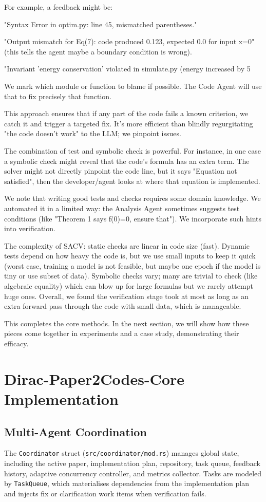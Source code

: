 \documentclass{ieeeaccess}
\begin{document}
For example, a feedback might be:

"Syntax Error in optim.py: line 45, mismatched parentheses."

"Output mismatch for Eq(7): code produced 0.123, expected 0.0 for input x=0" (this tells the agent maybe a boundary condition is wrong).

"Invariant 'energy conservation' violated in simulate.py (energy increased by 5%

We mark which module or function to blame if possible. The Code Agent will use that to fix precisely that function.

This approach ensures that if any part of the code fails a known criterion, we catch it and trigger a targeted fix. It's more efficient than blindly regurgitating "the code doesn't work" to the LLM; we pinpoint issues.

The combination of test and symbolic check is powerful. For instance, in one case a symbolic check might reveal that the code's formula has an extra term. The solver might not directly pinpoint the code line, but it says "Equation not satisfied", then the developer/agent looks at where that equation is implemented.

We note that writing good tests and checks requires some domain knowledge. We automated it in a limited way: the Analysis Agent sometimes suggests test conditions (like "Theorem 1 says f(0)=0, ensure that"). We incorporate such hints into verification.

The complexity of SACV: static checks are linear in code size (fast). Dynamic tests depend on how heavy the code is, but we use small inputs to keep it quick (worst case, training a model is not feasible, but maybe one epoch if the model is tiny or use subset of data). Symbolic checks vary; many are trivial to check (like algebraic equality) which can blow up for large formulas but we rarely attempt huge ones. Overall, we found the verification stage took at most as long as an extra forward pass through the code with small data, which is manageable.

This completes the core methods. In the next section, we will show how these pieces come together in experiments and a case study, demonstrating their efficacy.

\section{Dirac-Paper2Codes-Core Implementation}
\subsection{Multi-Agent Coordination}
The \texttt{Coordinator} struct (\texttt{src/coordinator/mod.rs}) manages global state, including the active paper, implementation plan, repository, task queue, feedback history, adaptive concurrency controller, and metrics collector. Tasks are modeled by \texttt{TaskQueue}, which materialises dependencies from the implementation plan and injects fix or clarification work items when verification fails.
\end{document}
